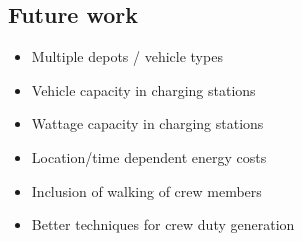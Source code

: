 \documentclass[]{article}
\begin{document}
\subsection{Future work}
\begin{itemize}
  \item Multiple depots / vehicle types
  \item Vehicle capacity in charging stations
  \item Wattage capacity in charging stations
  \item Location/time dependent energy costs
  \item Inclusion of walking of crew members
  \item Better techniques for crew duty generation
\end{itemize}
\printbibliography
\end{document}
